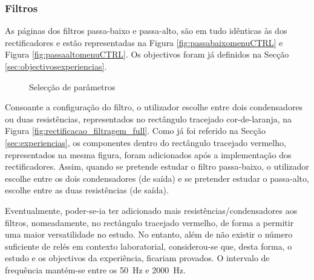 \subsubsection{Filtros}
\label{sec:filtrosSW}
As páginas dos filtros passa-baixo e passa-alto, são em tudo idênticas às dos rectificadores e estão representadas na Figura \ref{fig:passabaixomenuCTRL} e Figura \ref{fig:passaaltomenuCTRL}. Os objectivos foram já definidos na Secção \ref{sec:objectivosexperiencias}.

\begin{figure}[hbtp]
	\centering%
		\centering
		\qquad
		\caption{Selecção de parâmetros}%
		\label{fig:controlofiltros}%
\end{figure}

Consoante a configuração do filtro, o utilizador escolhe entre dois condensadores ou duas resistências, representados no rectângulo tracejado cor-de-laranja, na Figura \ref{fig:rectificacao_filtragem_full}. Como já foi referido na Secção \ref{sec:experiencias}, os componentes dentro do rectângulo tracejado vermelho, representados na mesma figura, foram adicionados após a implementação dos rectificadores. Assim, quando se pretende estudar o filtro passa-baixo, o utilizador escolhe entre os dois condensadores (de saída) e se pretender estudar o passa-alto, escolhe entre as duas resistências (de saída). 

Eventualmente, poder-se-ia ter adicionado mais resistências/condensadores aos filtros, nomeadamente, no rectângulo tracejado vermelho, de forma a permitir uma maior versatilidade no estudo. No entanto, além de não existir o número suficiente de relés em contexto laboratorial, considerou-se que, desta forma, o estudo e os objectivos da experiência, ficariam provados. O intervalo de frequência mantém-se entre os \SI{50}{\hertz} e \SI{2000}{\hertz}. 

